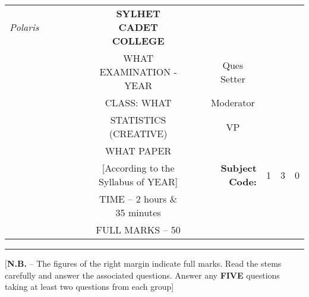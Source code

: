 \documentclass[12pt]{article}
\begin{document}
\begin{table}[]
\begin{tabular}{llllllcllrlll}
\textit{Polaris} &  &  &  &  &  & \textbf{SYLHET CADET COLLEGE}       &  &                       & \multicolumn{1}{l}{}                        &                        &                        &                        \\ \cline{10-13} 
                 &  &  &  &  &  & WHAT EXAMINATION - YEAR             &  & \multicolumn{1}{l|}{} & \multicolumn{1}{c|}{Ques Setter}            & \multicolumn{3}{l|}{}                                                    \\ \cline{10-13} 
                 &  &  &  &  &  & CLASS: WHAT                          &  & \multicolumn{1}{l|}{} & \multicolumn{1}{c|}{Moderator}              & \multicolumn{3}{l|}{}                                                    \\ \cline{10-13} 
                 &  &  &  &  &  & STATISTICS (CREATIVE)               &  & \multicolumn{1}{l|}{} & \multicolumn{1}{c|}{VP}                     & \multicolumn{3}{l|}{}                                                    \\ \cline{10-13} 
                 &  &  &  &  &  & WHAT PAPER                        &  &                       &                                             &                        &                        &                        \\ \cline{11-13} 
                 &  &  &  &  &  & [According to the Syllabus of YEAR] &  &                       & \multicolumn{1}{r|}{\textbf{Subject Code:}} & \multicolumn{1}{l|}{1} & \multicolumn{1}{l|}{3} & \multicolumn{1}{l|}{0} \\ \cline{11-13} 
                 &  &  &  &  &  & TIME – 2 hours \& 35 minutes        &  &                       &                                             &                        &                        &                        \\
                 &  &  &  &  &  & FULL MARKS – 50                     &  &                       & \textbf{}                                   &                        &                        &                       
\end{tabular}
\end{table}

\hrule

\begin{center}
[\textbf{N.B.} – The figures of the right margin indicate full marks. Read the stems carefully and answer the associated questions. Answer any \textbf{FIVE} questions taking at least two questions from each group]\\
\end{center}
\end{document}
